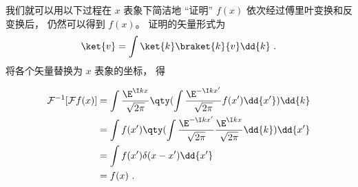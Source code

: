 我们就可以用以下过程在 $x$ 表象下简洁地 “证明” $f(x)$ 依次经过傅里叶变换和反变换后， 仍然可以得到 $f(x)$。 证明的矢量形式为
\begin{equation}
\ket{v} = \int \ket{k}\braket{k}{v} \dd{k}~.
\end{equation}
将各个矢量替换为 $x$ 表象的坐标， 得

\begin{equation}
\begin{aligned}
\mathcal F^{-1} [\mathcal F f(x)] &= \int \frac{\E^{\I k x}}{\sqrt{2\pi }} \qty(\int \frac{\E^{-\I k x'}}{\sqrt{2\pi }} f(x') \dd{x'}) \dd{k}\\
&= \int f(x') \qty(\int \frac{\E^{-\I k x'}}{\sqrt{2\pi }}\frac{\E^{\I k x}}{\sqrt{2\pi }}\dd{k}) \dd{x'}\\
&= \int f(x') \delta (x - x') \dd{x'}\\
&= f(x)~.
\end{aligned}
\end{equation}
